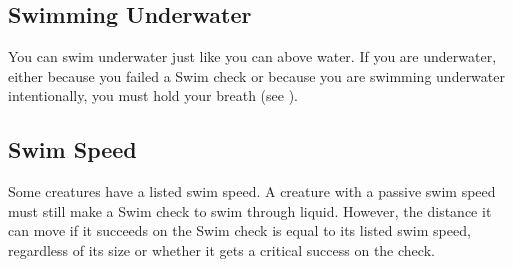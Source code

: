     \subsection{Swimming Underwater}
        You can swim underwater just like you can above water.
        If you are underwater, either because you failed a Swim check or because you are swimming underwater intentionally, you must hold your breath (see ).

    \subsection{Swim Speed}\label{Swim Speed}
        Some creatures have a listed swim speed.
        A creature with a passive swim speed must still make a Swim check to swim through liquid.
        However, the distance it can move if it succeeds on the Swim check is equal to its listed swim speed, regardless of its size or whether it gets a critical success on the check.
